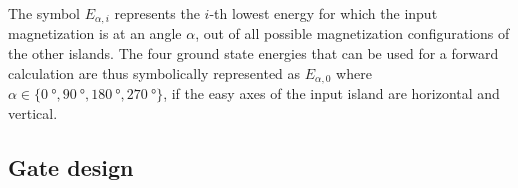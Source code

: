 \documentclass[11pt,a4paper,english]{article}
\begin{document}
The symbol $E_{\alpha,i}$ represents the $i$-th lowest energy for which the input magnetization is at an angle $\alpha$, out of all possible magnetization configurations of the other islands.
The four ground state energies that can be used for a forward calculation are thus symbolically represented as $E_{\alpha,0}$ where $\alpha \in \{ \SI{0}{\degree}, \SI{90}{\degree}, \SI{180}{\degree}, \SI{270}{\degree} \}$, if the easy axes of the input island are horizontal and vertical. \par

\subsection{Gate design}
\end{document}
